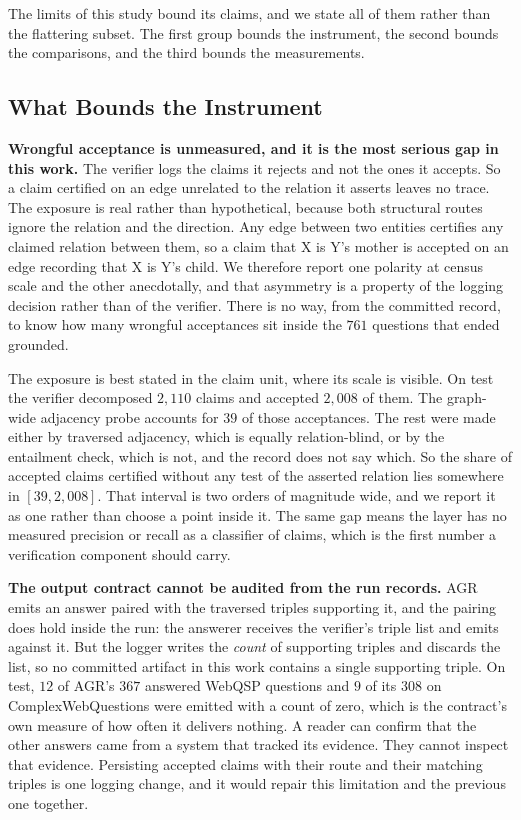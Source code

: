 The limits of this study bound its claims, and we state all of them
rather than the flattering subset. The first group bounds the
instrument, the second bounds the comparisons, and the third bounds the
measurements.

\subsection{What Bounds the Instrument}\label{sec:limits-contribution}

\textbf{Wrongful acceptance is unmeasured, and it is the most serious
gap in this work.} The verifier logs the claims it rejects and not the
ones it accepts. So a claim certified on an edge unrelated to the
relation it asserts leaves no trace. The exposure is real rather than
hypothetical, because both structural routes ignore the relation and the
direction. Any edge between two entities certifies any claimed relation
between them, so a claim that X is Y's mother is accepted on an edge
recording that X is Y's child. We therefore report one polarity at
census scale and the other anecdotally, and that asymmetry is a property
of the logging decision rather than of the verifier. There is no way,
from the committed record, to know how many wrongful acceptances sit
inside the $761$ questions that ended grounded.

The exposure is best stated in the claim unit, where its scale is
visible. On test the verifier decomposed $2{,}110$ claims and accepted
$2{,}008$ of them. The graph-wide adjacency probe accounts for $39$ of
those acceptances. The rest were made either by traversed adjacency,
which is equally relation-blind, or by the entailment check, which is
not, and the record does not say which. So the share of accepted claims
certified without any test of the asserted relation lies somewhere in
$[39, 2{,}008]$. That interval is two orders of magnitude wide, and we
report it as one rather than choose a point inside it. The same gap
means the layer has no measured precision or recall as a classifier of
claims, which is the first number a verification component should carry.

\textbf{The output contract cannot be audited from the run records.} AGR
emits an answer paired with the traversed triples supporting it, and the
pairing does hold inside the run: the answerer receives the verifier's
triple list and emits against it. But the logger writes the \emph{count}
of supporting triples and discards the list, so no committed artifact in
this work contains a single supporting triple. On test, $12$ of AGR's
$367$ answered WebQSP questions and $9$ of its $308$ on
ComplexWebQuestions were emitted with a count of zero, which is the
contract's own measure of how often it delivers nothing. A reader can
confirm that the other answers came from a system that tracked its
evidence. They cannot inspect that evidence. Persisting accepted claims
with their route and their matching triples is one logging change, and
it would repair this limitation and the previous one together.

